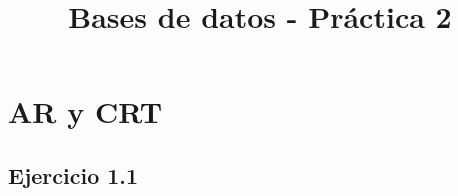 
\usepackage{geometry}

\title{Bases de datos - Práctica 2}
\author{}







\maketitle
\tableofcontents
\newpage
\section{AR y CRT}
\setlength{\columnsep}{0pt}
\subsection{Ejercicio 1.1}
